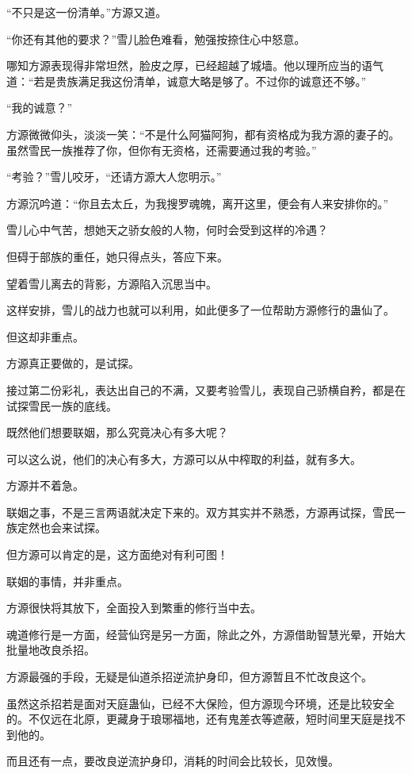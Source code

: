 \begin{this_body}
“不只是这一份清单。”方源又道。

“你还有其他的要求？”雪儿脸色难看，勉强按捺住心中怒意。

哪知方源表现得非常坦然，脸皮之厚，已经超越了城墙。他以理所应当的语气道：“若是贵族满足我这份清单，诚意大略是够了。不过你的诚意还不够。”

“我的诚意？”

方源微微仰头，淡淡一笑：“不是什么阿猫阿狗，都有资格成为我方源的妻子的。虽然雪民一族推荐了你，但你有无资格，还需要通过我的考验。”

“考验？”雪儿咬牙，“还请方源大人您明示。”

方源沉吟道：“你且去太丘，为我搜罗魂魄，离开这里，便会有人来安排你的。”

雪儿心中气苦，想她天之骄女般的人物，何时会受到这样的冷遇？

但碍于部族的重任，她只得点头，答应下来。

望着雪儿离去的背影，方源陷入沉思当中。

这样安排，雪儿的战力也就可以利用，如此便多了一位帮助方源修行的蛊仙了。

但这却非重点。

方源真正要做的，是试探。

接过第二份彩礼，表达出自己的不满，又要考验雪儿，表现自己骄横自矜，都是在试探雪民一族的底线。

既然他们想要联姻，那么究竟决心有多大呢？

可以这么说，他们的决心有多大，方源可以从中榨取的利益，就有多大。

方源并不着急。

联姻之事，不是三言两语就决定下来的。双方其实并不熟悉，方源再试探，雪民一族定然也会来试探。

但方源可以肯定的是，这方面绝对有利可图！

联姻的事情，并非重点。

方源很快将其放下，全面投入到繁重的修行当中去。

魂道修行是一方面，经营仙窍是另一方面，除此之外，方源借助智慧光晕，开始大批量地改良杀招。

方源最强的手段，无疑是仙道杀招逆流护身印，但方源暂且不忙改良这个。

虽然这杀招若是面对天庭蛊仙，已经不大保险，但方源现今环境，还是比较安全的。不仅远在北原，更藏身于琅琊福地，还有鬼差衣等遮蔽，短时间里天庭是找不到他的。

而且还有一点，要改良逆流护身印，消耗的时间会比较长，见效慢。


\end{this_body}
